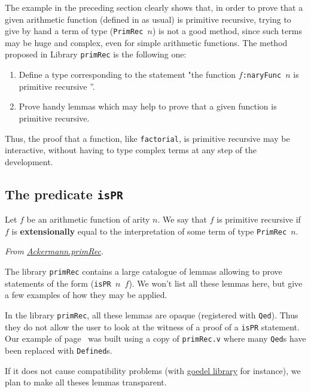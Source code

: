 The example in the preceding section clearly shows that, in order to prove that a given arithmetic function
(defined in \gallina{} as usual) is primitive recursive, trying to give  by hand a term  of type (\texttt{PrimRec $n$}) is not a good method, since such terms may be huge and complex, even for simple arithmetic functions. The method proposed in Library \texttt{primRec} is the following one:

\begin{enumerate}
\item Define a type corresponding to the statement "the function \texttt{$f$:naryFunc $n$} is primitive recursive ''.
\item Prove handy lemmas which may help to prove that a given function is primitive recursive.
\end{enumerate}

Thus, the proof that a function, like \texttt{factorial}, is primitive recursive may be interactive, without having to type complex terms at any step of the development.

\subsection{The predicate \texttt{isPR}}


Let $f$ be an arithmetic function of arity $n$. We say that $f$ is primitive recursive if $f$ is \textbf{extensionally}
equal to the interpretation of some term of type \texttt{PrimRec $n$}. 

\vspace{4pt}
\noindent
\emph{From \href{../theories/html/hydras.Ackermann.primRec.html}{Ackermann.primRec}.}



The library \texttt{primRec} contains a large catalogue of lemmas allowing to prove statements 
of the form (\texttt{isPR $n$ $f$}). We won't list all these lemmas here, but give a few examples of
how they may be applied.

\begin{remark}
In the library \texttt{primRec}, all these lemmas are opaque (registered with \texttt{Qed}). Thus they do not allow the user to look at the witness of a proof of a \texttt{isPR} statement. Our example of page~\pageref{sect:bigfac} was built using a  copy of \texttt{primRec.v} where many \texttt{Qed}s have been replaced with
\texttt{Defined}s.

If it does not cause compatibility problems (with 
\href{https://github.com/coq-community/goedel}{goedel library} for instance), we plan to make all theses lemmas transparent.
\end{remark}

